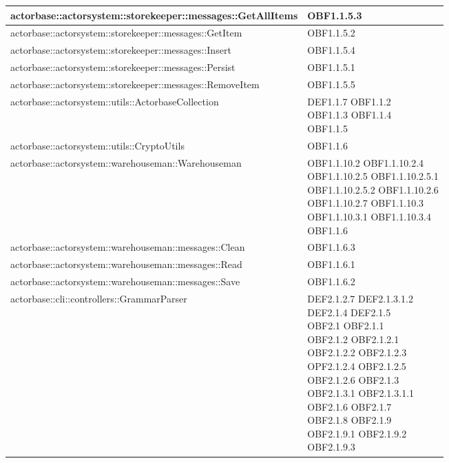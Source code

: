 \documentclass{scalatekids-article}
\begin{document}
\begin{longtable}[H]{|p{11.5cm}|p{5.5cm}|}
\hline
actorbase::actorsystem::storekeeper::messages::GetAllItems & \multiLineCell[t]{OBF1.1.5.3\\}\\
\hline
actorbase::actorsystem::storekeeper::messages::GetItem & \multiLineCell[t]{OBF1.1.5.2\\}\\
\hline
actorbase::actorsystem::storekeeper::messages::Insert & \multiLineCell[t]{OBF1.1.5.4\\}\\
\hline
actorbase::actorsystem::storekeeper::messages::Persist & \multiLineCell[t]{OBF1.1.5.1\\}\\
\hline
actorbase::actorsystem::storekeeper::messages::RemoveItem & \multiLineCell[t]{OBF1.1.5.5\\}\\
\hline
actorbase::actorsystem::utils::ActorbaseCollection & \multiLineCell[t]{DEF1.1.7 OBF1.1.2\\OBF1.1.3 OBF1.1.4\\OBF1.1.5}\\
\hline
actorbase::actorsystem::utils::CryptoUtils & \multiLineCell[t]{OBF1.1.6\\}\\
\hline
actorbase::actorsystem::warehouseman::Warehouseman & \multiLineCell[t]{OBF1.1.10.2 OBF1.1.10.2.4\\OBF1.1.10.2.5 OBF1.1.10.2.5.1\\OBF1.1.10.2.5.2 OBF1.1.10.2.6\\OBF1.1.10.2.7 OBF1.1.10.3\\OBF1.1.10.3.1 OBF1.1.10.3.4\\OBF1.1.6}\\
\hline
actorbase::actorsystem::warehouseman::messages::Clean & \multiLineCell[t]{OBF1.1.6.3\\}\\
\hline
actorbase::actorsystem::warehouseman::messages::Read & \multiLineCell[t]{OBF1.1.6.1\\}\\
\hline
actorbase::actorsystem::warehouseman::messages::Save & \multiLineCell[t]{OBF1.1.6.2\\}\\
\hline
actorbase::cli::controllers::GrammarParser & \multiLineCell[t]{DEF2.1.2.7 DEF2.1.3.1.2\\DEF2.1.4 DEF2.1.5\\OBF2.1 OBF2.1.1\\OBF2.1.2 OBF2.1.2.1\\OBF2.1.2.2 OBF2.1.2.3\\OPF2.1.2.4 OBF2.1.2.5\\OBF2.1.2.6 OBF2.1.3\\OBF2.1.3.1 OBF2.1.3.1.1\\OBF2.1.6 OBF2.1.7\\OBF2.1.8 OBF2.1.9\\OBF2.1.9.1 OBF2.1.9.2\\OBF2.1.9.3}\\

\end{longtable}
\end{document}
